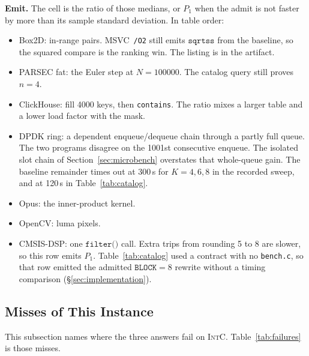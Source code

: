 \textbf{Emit.} The cell is the ratio of those medians, or \(P_1\) when the
admit is not faster by more than its sample standard deviation.
In table order:
\begin{itemize}
  \item Box2D: in-range pairs. MSVC~\texttt{/O2} still emits
  \(\texttt{sqrtss}\) from the baseline, so the squared compare is the
  ranking win. The listing is in the artifact.
  \item PARSEC fat: the Euler step at \(N=100000\). The catalog query
  still proves \(n=4\).
  \item ClickHouse: fill 4000 keys, then \texttt{contains}. The ratio
  mixes a larger table and a lower load factor with the mask.
  \label{sec:hash_eval}
  \item DPDK ring: a dependent enqueue/dequeue chain through a partly
  full queue. The two programs disagree on the 1001st consecutive
  enqueue. The isolated slot chain of
  Section~\ref{sec:microbench} overstates that whole-queue gain. The
  baseline remainder times out at 300\,s for \(K=4,6,8\) in the recorded
  sweep, and at 120\,s in Table~\ref{tab:catalog}.
  \item Opus: the inner-product kernel.
  \item OpenCV: luma pixels.
  \item CMSIS-DSP: one \(\texttt{filter()}\) call. Extra trips from
  rounding 5 to 8 are slower, so this row emits \(P_1\).
  Table~\ref{tab:catalog} used a contract with no \texttt{bench.c}, so
  that row emitted the admitted \(\texttt{BLOCK}=8\) rewrite without a
  timing comparison (\S\ref{sec:implementation}).
\end{itemize}

\subsection{Misses of This Instance}
\label{sec:failures}

This subsection names where the three answers fail on \textsc{IntC}.
Table~\ref{tab:failures} is those misses.

